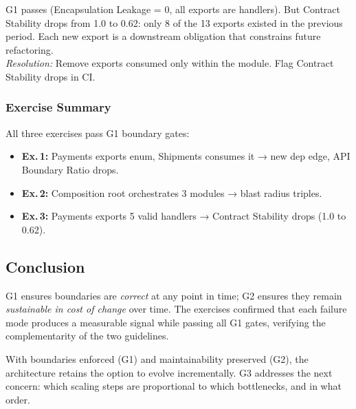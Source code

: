 \noindent
G1 passes (Encapsulation Leakage = 0, all exports are handlers). But Contract Stability drops from 1.0 to 0.62: only 8 of the 13 exports existed in the previous period. Each new export is a downstream obligation that constrains future refactoring.\\
\emph{Resolution:} Remove exports consumed only within the module. Flag Contract Stability drops in CI.

\subsubsection*{Exercise Summary}
All three exercises pass G1 boundary gates:
\begin{itemize}[itemsep=2pt,topsep=2pt]
  \item \textbf{Ex.\,1:} Payments exports enum, Shipments consumes it → new dep edge, API Boundary Ratio drops.
  \item \textbf{Ex.\,2:} Composition root orchestrates 3 modules → blast radius triples.
  \item \textbf{Ex.\,3:} Payments exports 5 valid handlers → Contract Stability drops (1.0 to 0.62).
\end{itemize}

\subsection*{Conclusion}

G1 ensures boundaries are \emph{correct} at any point in time; G2 ensures they remain \emph{sustainable in cost of change} over time. The exercises confirmed that each failure mode produces a measurable signal while passing all G1 gates, verifying the complementarity of the two guidelines.

With boundaries enforced (G1) and maintainability preserved (G2), the architecture retains the option to evolve incrementally. G3 addresses the next concern: which scaling steps are proportional to which bottlenecks, and in what order.
